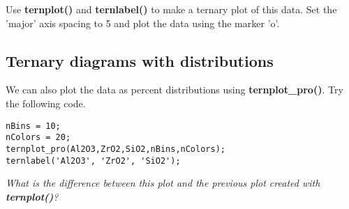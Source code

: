 \documentclass[10pt,fleqn]{article}
\begin{document}
Use \textbf{ternplot()} and \textbf{ternlabel()} to make a ternary plot of this data. Set the 'major' axis spacing to 5 and plot the data using the marker 'o'.

\subsection*{Ternary diagrams with distributions}

We can also plot the data as percent distributions using \textbf{ternplot\_pro()}. Try the following code.

\begin{lstlisting}
nBins = 10;
nColors = 20;
ternplot_pro(Al2O3,ZrO2,SiO2,nBins,nColors);
ternlabel('Al2O3', 'ZrO2', 'SiO2');
\end{lstlisting}

\textit{What is the difference between this plot and the previous plot created with \textbf{ternplot()}?}
\end{document}
